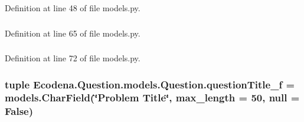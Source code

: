 Definition at line 48 of file models.py.

\hypertarget{class_ecodena_1_1_question_1_1models_1_1_question_afbbad3df2af71e795a4397ae19f1433d}{
\subsubsection[{questionText\_\-f}]{}}
\label{d1/d67/class_ecodena_1_1_question_1_1models_1_1_question_afbbad3df2af71e795a4397ae19f1433d}


Definition at line 65 of file models.py.

\hypertarget{class_ecodena_1_1_question_1_1models_1_1_question_acece4b7c3af5411b6521468bfd308a38}{
\subsubsection[{questionTitle\_\-f}]{}}
\label{d1/d67/class_ecodena_1_1_question_1_1models_1_1_question_acece4b7c3af5411b6521468bfd308a38}


Definition at line 72 of file models.py.

\hypertarget{class_ecodena_1_1_question_1_1models_1_1_question_a512bdc07c3ee6ad6f64bf06810cdbd77}{
\subsubsection[{questionTitle\_\-f}]{\setlength{\rightskip}{0pt plus 5cm}tuple {\bf Ecodena.Question.models.Question.questionTitle\_\-f} = models.CharField(\char`\"{}Problem Title\char`\"{}, max\_\-length = 50, null = False)}}
\label{d1/d67/class_ecodena_1_1_question_1_1models_1_1_question_a512bdc07c3ee6ad6f64bf06810cdbd77}


